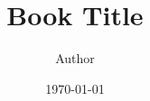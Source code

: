 \usepackage{lipsum}

\title{Book Title}
\author{Author}
\date{\today}
\def\publisher{Publisher}
\def\publisherlogo{jr_press.png}
\def\bookedition{First}
\def\coverimage{}
\def\backcoverimage{}
\def\heightunit{'}
